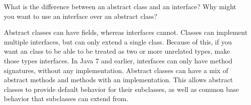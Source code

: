 What is the difference between an abstract class and an interface? Why might you want to use an interface over an abstract class? \\
\begin{answer}
Abstract classes can have fields, whereas interfaces cannot. Classes can implement multiple interfaces, but can only extend a single class. Because of this, if you want an class to be able to be treated as two or more unrelated types, make those types interfaces. In Java 7 and earlier, interfaces can only have method signatures, without any implementation. Abstract classes can have a mix of abstract methods and methods with an implementation. This allows abstract classes to provide default behavior for their subclasses, as well as common base behavior that subclasses can extend from.
\end{answer}
